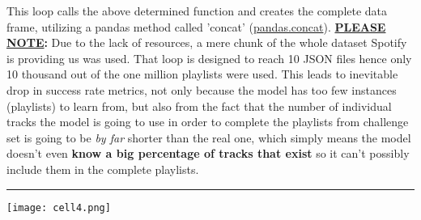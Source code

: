 \documentclass[]{article}
\begin{document}
This loop calls the above determined function and creates the complete data frame, utilizing a pandas method called 'concat' (\href{https://pandas.pydata.org/docs/reference/api/pandas.concat.html}{pandas.concat}). \textbf{\underline{PLEASE NOTE}:} Due to the lack
of resources, a mere chunk of the whole dataset Spotify is providing us was used. That loop is designed to reach 10 JSON files
hence only 10 thousand out of the one million playlists were used. This leads to inevitable drop in success rate metrics, not only because the model has too few instances (playlists) to learn from, but also from the fact that the number of individual tracks the model is going to use in order to complete the playlists from challenge set is going to be \textit{by far} shorter than the real one, which simply means the model doesn't even \textbf{know a big percentage of tracks that exist} so it can't possibly include them in the complete playlists. 
\\
\noindent
{\color{Blue} \rule{\linewidth}{0.5mm}}
\texttt{[image: cell4.png]}
\end{document}
